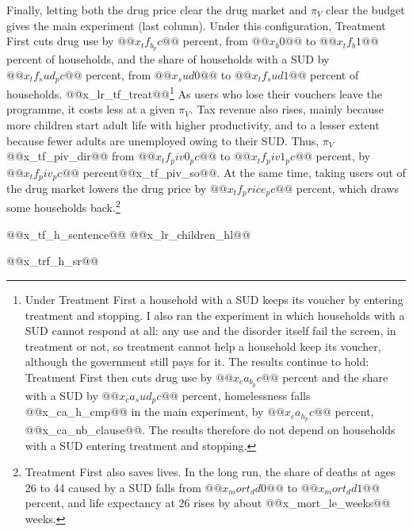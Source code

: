 \documentclass[10pt]{article}
\begin{document}
Finally, letting both the drug price clear the drug market and $\pi_V$ clear the budget gives the main experiment (last column). Under this configuration, Treatment First cuts drug use by $@@x_tf_b_pc@@$ percent,
from $@@x_b0@@$ to $@@x_tf_b1@@$ percent of households, and the share of households with
a SUD by $@@x_tf_sud_pc@@$ percent, from $@@x_sud0@@$ to $@@x_tf_sud1@@$ percent of
households. @@x_lr_tf_treat@@\footnote{Under Treatment First a household with a SUD keeps its voucher by entering treatment and stopping. I also ran the experiment in which households with a SUD cannot respond at all: any use and the disorder itself fail the screen, in treatment or not, so treatment cannot help a household keep its voucher, although the government still pays for it. The results continue to hold: Treatment First then cuts drug use by $@@x_ca_b_pc@@$ percent and the share with a SUD by $@@x_ca_sud_pc@@$ percent, homelessness falls @@x_ca_h_cmp@@ in the main experiment, by $@@x_ca_h_pc@@$ percent, @@x_ca_nb_clause@@. The results therefore do not depend on households with a SUD entering treatment and stopping.} As users who lose their vouchers leave the programme, it costs
less at a given $\pi_V$. Tax revenue also rises, mainly because more children start adult life with higher productivity, and to a lesser extent because fewer adults are unemployed owing to their SUD. Thus, $\pi_V$ @@x_tf_piv_dir@@ from $@@x_tf_piv0_pc@@$ to
$@@x_tf_piv1_pc@@$ percent, by $@@x_tf_piv_pc@@$ percent@@x_tf_piv_so@@. At the same time, taking users out of the drug market lowers the drug price by
$@@x_tf_price_pc@@$ percent, which draws some households back.\footnote{Treatment First also saves lives. In the long run, the share of deaths at ages 26 to 44 caused by a SUD falls from $@@x_mort_dd0@@$ to $@@x_mort_dd1@@$ percent, and life expectancy at 26 rises by about @@x_mort_le_weeks@@ weeks.} 

@@x_tf_h_sentence@@ @@x_lr_children_hl@@

@@x_trf_h_sr@@
\end{document}
